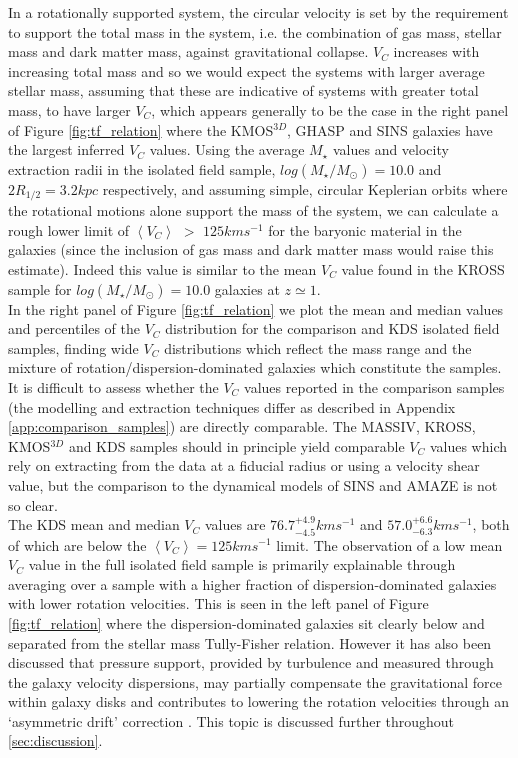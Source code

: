 \documentclass[fleqn,usenatbib]{mn2e}
\begin{document}
In a rotationally supported system, the circular velocity is set by the requirement to support the total mass in the system, i.e. the combination of gas mass, stellar mass and dark matter mass, against gravitational collapse.
$V_{C}$ increases with increasing total mass and so we would expect the systems with larger average stellar mass, assuming that these are indicative of systems with greater total mass, to have larger $V_{C}$, which appears generally to be the case in the right panel of Figure \ref{fig:tf_relation} where the KMOS$^{3D}$, GHASP and SINS galaxies have the largest inferred $V_{C}$ values.
Using the average $M_{\star}$ values and velocity extraction radii in the isolated field sample, $log(M_{\star}/M_{\odot})=10.0$ and $2R_{1/2} = 3.2kpc$ respectively, and assuming simple, circular Keplerian orbits where the rotational motions alone support the mass of the system, we can calculate a rough lower limit of $\left<V_{C}\right>$ $>$ $125kms^{-1}$ for the baryonic material in the galaxies (since the inclusion of gas mass and dark matter mass would raise this estimate).
Indeed this value is similar to the mean $V_{C}$ value found in the KROSS sample for $log(M_{\star}/M_{\odot})=10.0$ galaxies at $z\simeq1$. \\

In the right panel of Figure \ref{fig:tf_relation} we plot the mean and median values and percentiles of the $V_{C}$ distribution for the comparison and KDS isolated field samples, finding wide $V_{C}$ distributions which reflect the mass range and the mixture of rotation/dispersion-dominated galaxies which constitute the samples.
It is difficult to assess whether the $V_{C}$ values reported in the comparison samples (the modelling and extraction techniques differ as described in Appendix \ref{app:comparison_samples}) are directly comparable.
The MASSIV, KROSS, KMOS$^{3D}$ and KDS samples should in principle yield comparable $V_{C}$ values which rely on extracting from the data at a fiducial radius or using a velocity shear value, but the comparison to the dynamical models of SINS and AMAZE is not so clear. \\

The KDS mean and median $V_{C}$ values are $76.7^{+4.9}_{-4.5}kms^{-1}$ and $57.0^{+6.6}_{-6.3}kms^{-1}$, both of which are below the $\left<V_{C}\right> = 125kms^{-1}$ limit.
The observation of a low mean $V_{C}$ value in the full isolated field sample is primarily explainable through averaging over a sample with a higher fraction of dispersion-dominated galaxies with lower rotation velocities.
This is seen in the left panel of Figure \ref{fig:tf_relation} where the dispersion-dominated galaxies sit clearly below and separated from the stellar mass Tully-Fisher relation.
However it has also been discussed that pressure support, provided by turbulence and measured through the galaxy velocity dispersions, may partially compensate the gravitational force within galaxy disks and contributes to lowering the rotation velocities through an `asymmetric drift' correction \citep[e.g.][]{Burkert2010,Newman2013,Genzel2017}.
This topic is discussed further throughout \cref{sec:discussion}. 
\end{document}
